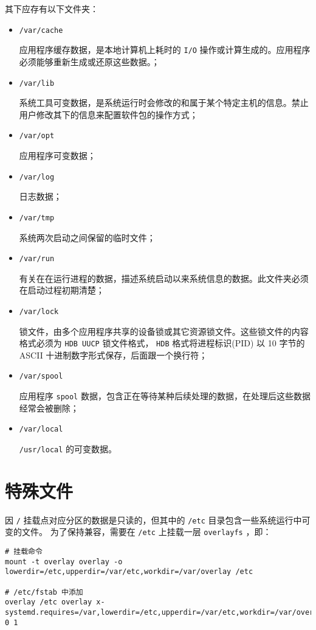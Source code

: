 \documentclass{utart}
\begin{document}
其下应存有以下文件夹：
\begin{itemize}[leftmargin=4em]
\item \texttt{/var/cache}

  应用程序缓存数据，是本地计算机上耗时的 \texttt{I/O} 操作或计算生成的。应用程序必须能够重新生成或还原这些数据。；
\item \texttt{/var/lib}

  系统工具可变数据，是系统运行时会修改的和属于某个特定主机的信息。禁止用户修改其下的信息来配置软件包的操作方式；
\item \texttt{/var/opt}

  应用程序可变数据；
\item \texttt{/var/log}

  日志数据；
\item \texttt{/var/tmp}

  系统两次启动之间保留的临时文件；
\item \texttt{/var/run}

  有关在在运行进程的数据，描述系统启动以来系统信息的数据。此文件夹必须在启动过程初期清楚；
\item \texttt{/var/lock}

  锁文件，由多个应用程序共享的设备锁或其它资源锁文件。这些锁文件的内容格式必须为 \texttt{HDB UUCP} 锁文件格式，
  \texttt{HDB} 格式将进程标识(PID) 以 10 字节的 ASCII 十进制数字形式保存，后面跟一个换行符；
\item \texttt{/var/spool}

  应用程序 \texttt{spool} 数据，包含正在等待某种后续处理的数据，在处理后这些数据经常会被删除；
\item \texttt{/var/local}

  \texttt{/usr/local} 的可变数据。
\end{itemize}

\section{特殊文件}
因 \texttt{/} 挂载点对应分区的数据是只读的，但其中的 \texttt{/etc} 目录包含一些系统运行中可变的文件。
为了保持兼容，需要在 \texttt{/etc} 上挂载一层 \texttt{overlayfs} ，即：

\begin{verbatim}
# 挂载命令
mount -t overlay overlay -o lowerdir=/etc,upperdir=/var/etc,workdir=/var/overlay /etc

# /etc/fstab 中添加
overlay /etc overlay x-systemd.requires=/var,lowerdir=/etc,upperdir=/var/etc,workdir=/var/overlay 0 1
\end{verbatim}
\end{document}
